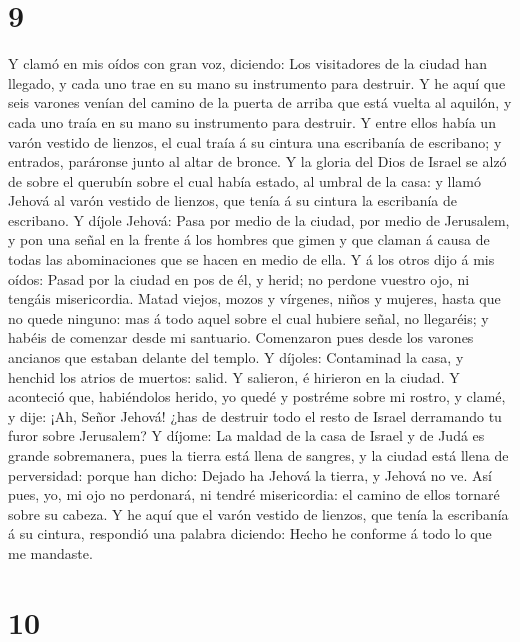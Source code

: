 \hypertarget{section-8}{%
\section{9}\label{section-8}}

 Y clamó en mis oídos con gran voz, diciendo: Los
visitadores de la ciudad han llegado, y cada uno trae en su mano su
instrumento para destruir.  Y he aquí que seis varones
venían del camino de la puerta de arriba que está vuelta al aquilón, y
cada uno traía en su mano su instrumento para destruir. Y entre ellos
había un varón vestido de lienzos, el cual traía á su cintura una
escribanía de escribano; y entrados, paráronse junto al altar de bronce.
 Y la gloria del Dios de Israel se alzó de sobre el querubín
sobre el cual había estado, al umbral de la casa: y llamó Jehová al
varón vestido de lienzos, que tenía á su cintura la escribanía de
escribano.  Y díjole Jehová: Pasa por medio de la ciudad,
por medio de Jerusalem, y pon una señal en la frente á los hombres que
gimen y que claman á causa de todas las abominaciones que se hacen en
medio de ella.  Y á los otros dijo á mis oídos: Pasad por la
ciudad en pos de él, y herid; no perdone vuestro ojo, ni tengáis
misericordia.  Matad viejos, mozos y vírgenes, niños y
mujeres, hasta que no quede ninguno: mas á todo aquel sobre el cual
hubiere señal, no llegaréis; y habéis de comenzar desde mi santuario.
Comenzaron pues desde los varones ancianos que estaban delante del
templo.  Y díjoles: Contaminad la casa, y henchid los atrios
de muertos: salid. Y salieron, é hirieron en la ciudad.  Y
aconteció que, habiéndolos herido, yo quedé y postréme sobre mi rostro,
y clamé, y dije: ¡Ah, Señor Jehová! ¿has de destruir todo el resto de
Israel derramando tu furor sobre Jerusalem?  Y díjome: La
maldad de la casa de Israel y de Judá es grande sobremanera, pues la
tierra está llena de sangres, y la ciudad está llena de perversidad:
porque han dicho: Dejado ha Jehová la tierra, y Jehová no ve.
 Así pues, yo, mi ojo no perdonará, ni tendré misericordia:
el camino de ellos tornaré sobre su cabeza.  Y he aquí que
el varón vestido de lienzos, que tenía la escribanía á su cintura,
respondió una palabra diciendo: Hecho he conforme á todo lo que me
mandaste.

\hypertarget{section-9}{%
\section{10}\label{section-9}}

